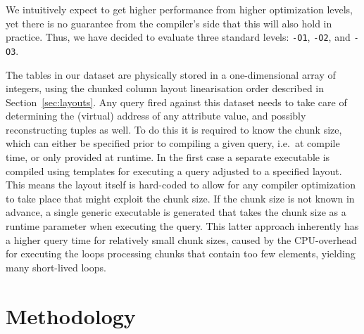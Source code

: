 \documentclass{sig-alternate}
\begin{document}
 We intuitively expect to get higher performance from higher optimization levels, yet there is no guarantee from the compiler's side that this will also hold in practice. Thus, we have decided to evaluate three standard levels: \texttt{-O1}, \texttt{-O2}, and \texttt{-O3}.


 The tables in our dataset are physically stored in a one-dimensional array of integers, using the chunked column layout linearisation order described in Section~\ref{sec:layouts}. Any query fired against this dataset needs to take care of determining the (virtual) address of any attribute value, and possibly reconstructing tuples as well. To do this it is required to know the chunk size, which can either be specified prior to compiling a given query, i.e.~at compile time, or only provided at runtime. In the first case a separate executable is compiled using templates for executing a query adjusted to a specified layout. This means the layout itself is hard-coded to allow for any compiler optimization to take place that might exploit the chunk size. If the chunk size is not known in advance, a single generic executable is generated that takes the chunk size as a runtime parameter when executing the query. This latter approach inherently has a higher query time for relatively small chunk sizes, caused by the CPU-overhead for executing the loops processing chunks that contain too few elements, yielding many short-lived loops.

\section{Methodology}
\end{document}

